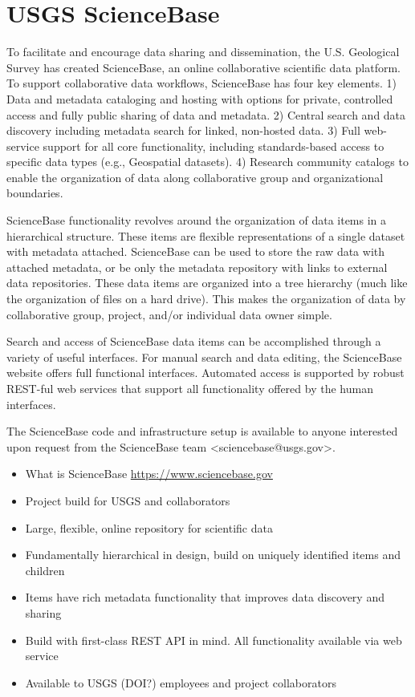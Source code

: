 \section{USGS ScienceBase}

To facilitate and encourage data sharing and dissemination, 
the U.S. Geological Survey has created ScienceBase, an online 
collaborative scientific data platform. To support collaborative 
data workflows, ScienceBase has four key elements. 1) Data and metadata
cataloging and hosting with options for private, controlled access 
and fully public sharing of data and metadata. 2) Central search and
data discovery including metadata search for linked, non-hosted data. 
3) Full web-service support for all core functionality, including 
standards-based access to specific data types (e.g., Geospatial 
datasets). 4) Research community catalogs to 
enable the organization of data along collaborative group and 
organizational boundaries. 

ScienceBase functionality revolves around the organization of data 
items in a hierarchical structure. These items are flexible representations
of a single dataset with metadata attached. ScienceBase can be used to
store the raw data with attached metadata, or be only the metadata 
repository with links to external data repositories. These data items
are organized into a tree hierarchy (much like the organization of files
on a hard drive). This makes the organization of data by collaborative 
group, project, and/or individual data owner simple. 

Search and access of ScienceBase data items can be accomplished through
a variety of useful interfaces. For manual search and data editing, 
the ScienceBase website offers full functional interfaces. Automated
access is supported by robust REST-ful web services that support all 
functionality offered by the human interfaces. 

The ScienceBase code and infrastructure setup is available to anyone
interested upon request from the ScienceBase team <sciencebase@usgs.gov>.



\begin{itemize}
	\item{What is ScienceBase \url{https://www.sciencebase.gov}}
	\item{Project build for USGS and collaborators}
	\item{Large, flexible, online repository for scientific data}
	\item{Fundamentally hierarchical in design, build on uniquely identified items and children}
	\item{Items have rich metadata functionality that improves data discovery and sharing}
	\item{Build with first-class REST API in mind. All functionality available via web service}
	\item{Available to USGS (DOI?) employees and project collaborators}
\end{itemize}
